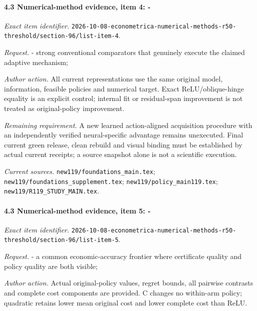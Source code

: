 \paragraph{4.3 Numerical-method evidence, item 4: -}

\emph{Exact item identifier.} \nolinkurl{2026-10-08-econometrica-numerical-methods-r50-threshold/section-96/list-item-4}.

\par\emph{Request.} - strong conventional comparators that genuinely execute the claimed adaptive mechanism;

\par\emph{Author action.} All current representations use the same original model, information, feasible policies and numerical target. Exact ReLU/\allowbreak{}oblique-hinge equality is an explicit control; internal fit or residual-span improvement is not treated as original-policy improvement.

\par\emph{Remaining requirement.} A new learned action-aligned acquisition procedure with an independently verified neural-specific advantage remains unexecuted. Final current green release, clean rebuild and visual binding must be established by actual current receipts; a source snapshot alone is not a scientific execution.

\par\emph{Current sources.} \nolinkurl{new119/foundations_main.tex}; \nolinkurl{new119/foundations_supplement.tex}; \nolinkurl{new119/policy_main119.tex}; \nolinkurl{new119/R119_STUDY_MAIN.tex}.

\paragraph{4.3 Numerical-method evidence, item 5: -}

\emph{Exact item identifier.} \nolinkurl{2026-10-08-econometrica-numerical-methods-r50-threshold/section-96/list-item-5}.

\par\emph{Request.} - a common economic-accuracy frontier where certificate quality and policy quality are both visible;

\par\emph{Author action.} Actual original-policy values, regret bounds, all pairwise contrasts and complete cost components are provided. C changes no within-arm policy; quadratic retains lower mean original cost and lower complete cost than ReLU.

